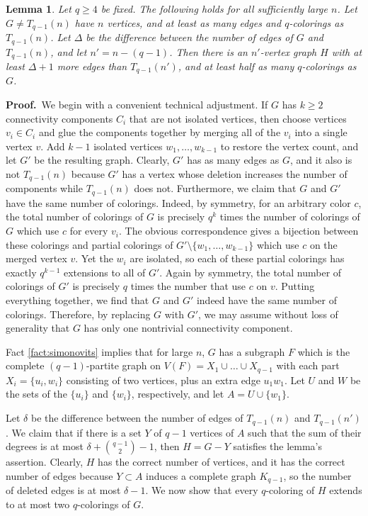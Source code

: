 \documentclass[11pt]{article}
\newtheorem{lemma}[theorem]{Lemma}
\begin{document}
\begin{lemma}
  \label{lem:exact:turan}
  Let $q \geq 4$ be fixed.  The following holds for all sufficiently
  large $n$.  Let $G \neq T_{q-1}(n)$ have $n$ vertices, and at least
  as many edges and $q$-colorings as $T_{q-1}(n)$.  Let $\Delta$ be
  the difference between the number of edges of $G$ and $T_{q-1}(n)$,
  and let $n' = n-(q-1)$.  Then there is an $n'$-vertex graph $H$ with
  at least $\Delta + 1$ more edges than $T_{q-1}(n')$, and at least
  half as many $q$-colorings as $G$.
\end{lemma}

\noindent \textbf{Proof.}\, We begin with a convenient technical
adjustment.  If $G$ has $k \geq 2$ connectivity components $C_i$ that
are not isolated vertices, then choose vertices $v_i \in C_i$ and glue
the components together by merging all of the $v_i$ into a single
vertex $v$.  Add $k-1$ isolated vertices $w_1, \ldots, w_{k-1}$ to
restore the vertex count, and let $G'$ be the resulting graph.
Clearly, $G'$ has as many edges as $G$, and it also is not
$T_{q-1}(n)$ because $G'$ has a vertex whose deletion increases the
number of components while $T_{q-1}(n)$ does not.  Furthermore, we
claim that $G$ and $G'$ have the same number of colorings.  Indeed, by
symmetry, for an arbitrary color $c$, the total number of colorings of
$G$ is precisely $q^k$ times the number of colorings of $G$ which use
$c$ for every $v_i$.  The obvious correspondence gives a bijection
between these colorings and partial colorings of $G' \setminus \{w_1,
\ldots, w_{k-1}\}$ which use $c$ on the merged vertex $v$.  Yet the
$w_i$ are isolated, so each of these partial colorings has exactly
$q^{k-1}$ extensions to all of $G'$.  Again by symmetry, the total
number of colorings of $G'$ is precisely $q$ times the number that use
$c$ on $v$.  Putting everything together, we find that $G$ and $G'$
indeed have the same number of colorings.  Therefore, by replacing $G$
with $G'$, we may assume without loss of generality that $G$ has only
one nontrivial connectivity component.

Fact \ref{fact:simonovits} implies that for large $n$, $G$ has a
subgraph $F$ which is the complete $(q-1)$-partite graph on $V(F) =
X_1 \cup \ldots \cup X_{q-1}$ with each part $X_i = \{u_i, w_i\}$
consisting of two vertices, plus an extra edge $u_1 w_1$.  Let $U$ and
$W$ be the sets of the $\{u_i\}$ and $\{w_i\}$, respectively, and let
$A = U \cup \{w_1\}$.

Let $\delta$ be the difference between the number of edges of
$T_{q-1}(n)$ and $T_{q-1}(n')$.  We claim that if there is a set $Y$
of $q-1$ vertices of $A$ such that the sum of their degrees is at most
$\delta + {q-1 \choose 2} - 1$, then $H = G - Y$ satisfies the lemma's
assertion.  Clearly, $H$ has the correct number of vertices, and it
has the correct number of edges because $Y \subset A$ induces a
complete graph $K_{q-1}$, so the number of deleted edges is at most
$\delta - 1$.  We now show that every $q$-coloring of $H$ extends to
at most two $q$-colorings of $G$.
\end{document}
